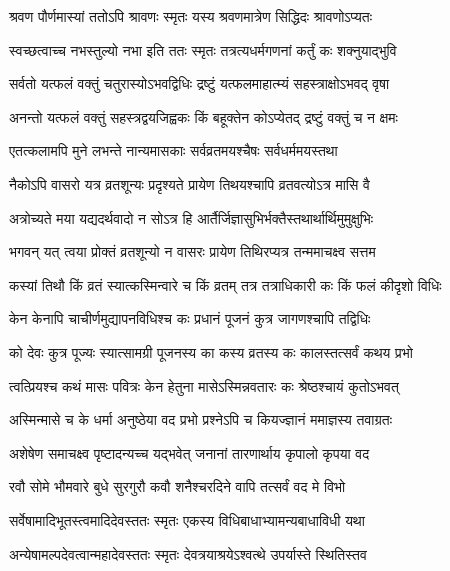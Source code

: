\twolineshloka
{श्रवण पौर्णमास्यां ततोऽपि श्रावणः स्मृतः}
{यस्य श्रवणमात्रेण सिद्धिदः श्रावणोऽप्यतः} %

\twolineshloka
{स्वच्छत्वाच्च नभस्तुल्यो नभा इति ततः स्मृतः}
{तत्रत्यधर्मगणनां कर्तुं कः शक्नुयाद्भुवि} %

\twolineshloka
{सर्वतो यत्फलं वक्तुं चतुरास्योऽभवद्विधिः}
{द्रष्टुं यत्फलमाहात्म्यं सहस्त्राक्षोऽभवद् वृषा} %

\twolineshloka
{अनन्तो यत्फलं वक्तुं सहस्त्रद्वयजिह्वकः}
{किं बहूक्तेन कोऽप्येतद् द्रष्टुं वक्तुं च न क्षमः} %

\twolineshloka
{एतत्कलामपि मुने लभन्ते नान्यमासकाः}
{सर्वव्रतमयश्चैषः सर्वधर्ममयस्तथा} %

\twolineshloka
{नैकोऽपि वासरो यत्र व्रतशून्यः प्रदृश्यते}
{प्रायेण तिथयश्चापि व्रतवत्योऽत्र मासि वै} %

\twolineshloka
{अत्रोच्यते मया यद्यदर्थवादो न सोऽत्र हि}
{आर्तैर्जिज्ञासुभिर्भक्तैस्तथार्थार्थिमुमुक्षुभिः} %


\twolineshloka
{भगवन् यत् त्वया प्रोक्तं व्रतशून्यो न वासरः}
{प्रायेण तिथिरप्यत्र तन्ममाचक्ष्व सत्तम} %

\twolineshloka
{कस्यां तिथौ किं व्रतं स्यात्कस्मिन्वारे च किं व्रतम्}
{तत्र तत्राधिकारी कः किं फलं कीदृशो विधिः} %

\twolineshloka
{केन केनापि चाचीर्णमुद्यापनविधिश्च कः}
{प्रधानं पूजनं कुत्र जागणश्चापि तद्विधिः} %

\twolineshloka
{को देवः कुत्र पूज्यः स्यात्सामग्री पूजनस्य का}
{कस्य व्रतस्य कः कालस्तत्सर्वं कथय प्रभो} %

\twolineshloka
{त्वत्प्रियश्च कथं मासः पवित्रः केन हेतुना}
{मासेऽस्मिन्नवतारः कः श्रेष्ठश्चायं कुतोऽभवत्} %

\twolineshloka
{अस्मिन्मासे च के धर्मा अनुष्ठेया वद प्रभो}
{प्रश्नेऽपि च कियज्ज्ञानं ममाज्ञस्य तवाग्रतः} %

\twolineshloka
{अशेषेण समाचक्ष्व पृष्टादन्यच्च यद्भवेत्}
{जनानां तारणार्थाय कृपालो कृपया वद} %

\twolineshloka
{रवौ सोमे भौमवारे बुधे सुरगुरौ कवौ}
{शनैश्चरदिने वापि तत्सर्वं वद मे विभो} %

\twolineshloka
{सर्वेषामादिभूतस्त्वमादिदेवस्ततः स्मृतः}
{एकस्य विधिबाधाभ्यामन्यबाधाविधी यथा} %

\twolineshloka
{अन्येषामल्पदेवत्वान्महादेवस्ततः स्मृतः}
{देवत्रयाश्रयेऽश्वत्थे उपर्यास्ते स्थितिस्तव} %

